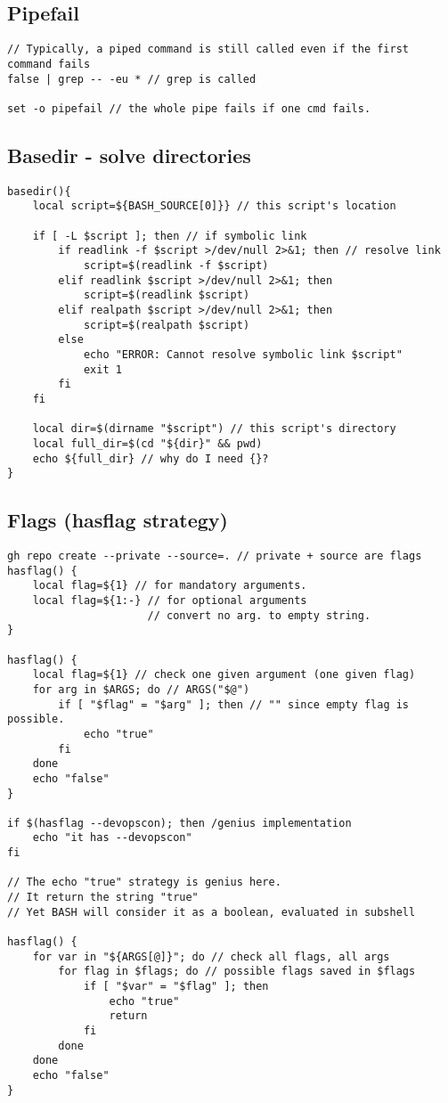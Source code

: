 \subsection{Pipefail}

\begin{verbatim}
// Typically, a piped command is still called even if the first command fails
false | grep -- -eu * // grep is called

set -o pipefail // the whole pipe fails if one cmd fails. 
\end{verbatim}

\subsection{Basedir - solve directories}

\begin{verbatim}
basedir(){
    local script=${BASH_SOURCE[0]}} // this script's location

    if [ -L $script ]; then // if symbolic link
        if readlink -f $script >/dev/null 2>&1; then // resolve link
            script=$(readlink -f $script)
        elif readlink $script >/dev/null 2>&1; then
            script=$(readlink $script)
        elif realpath $script >/dev/null 2>&1; then
            script=$(realpath $script)
        else
            echo "ERROR: Cannot resolve symbolic link $script"
            exit 1 
        fi
    fi

    local dir=$(dirname "$script") // this script's directory
    local full_dir=$(cd "${dir}" && pwd)
    echo ${full_dir} // why do I need {}?
}

\end{verbatim}

\subsection{Flags (hasflag strategy)}

\begin{verbatim}
gh repo create --private --source=. // private + source are flags
hasflag() {
    local flag=${1} // for mandatory arguments. 
    local flag=${1:-} // for optional arguments
                      // convert no arg. to empty string. 
}

hasflag() {
    local flag=${1} // check one given argument (one given flag)
    for arg in $ARGS; do // ARGS("$@")
        if [ "$flag" = "$arg" ]; then // "" since empty flag is possible.
            echo "true"
        fi
    done
    echo "false"
}

if $(hasflag --devopscon); then /genius implementation
    echo "it has --devopscon"
fi

// The echo "true" strategy is genius here. 
// It return the string "true"
// Yet BASH will consider it as a boolean, evaluated in subshell

hasflag() {
    for var in "${ARGS[@]}"; do // check all flags, all args
        for flag in $flags; do // possible flags saved in $flags
            if [ "$var" = "$flag" ]; then
                echo "true"
                return
            fi
        done
    done
    echo "false"
}
\end{verbatim}


